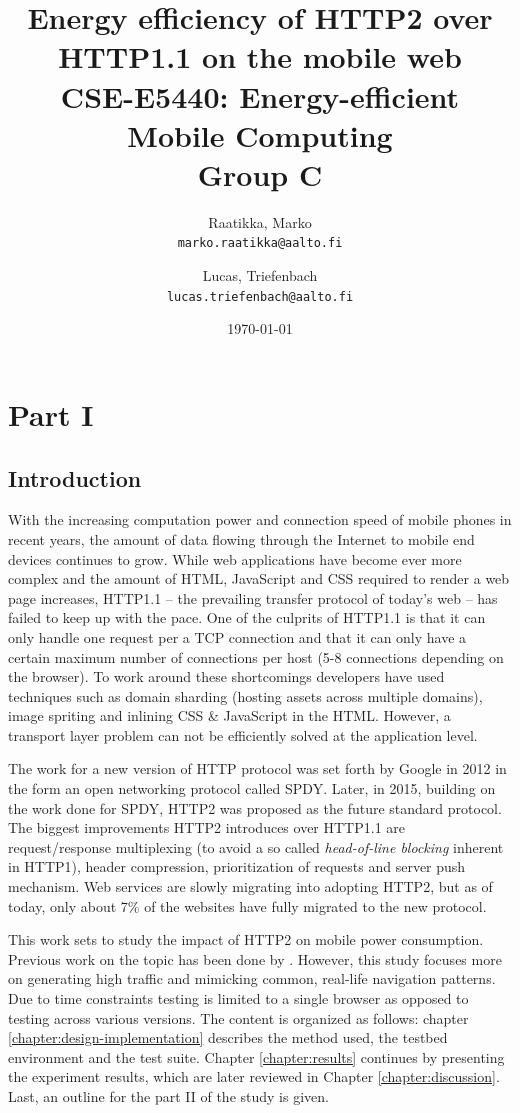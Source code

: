 \documentclass{article}
\author{
  Raatikka, Marko\\
  \texttt{marko.raatikka@aalto.fi}
  \and
  Lucas, Triefenbach\\
  \texttt{lucas.triefenbach@aalto.fi}
}
\title{Energy efficiency of HTTP2 over HTTP1.1 on the mobile web
\\
\vspace{5mm}
\large{CSE-E5440: Energy-efficient Mobile Computing\\Group C}
}
\date{\today}
\begin{document}
\maketitle
\clearpage

\section{Part I}

\subsection{Introduction}
With the increasing computation power and connection speed of mobile phones in recent years, the amount of data flowing through the Internet to mobile end devices continues to grow. While web applications have become ever more complex and the amount of HTML, JavaScript and CSS required to render a web page increases, HTTP1.1 -- the prevailing transfer protocol of today's web -- has failed to keep up with the pace. One of the culprits of HTTP1.1 is that it can only handle one request per a TCP connection and that it can only have a certain maximum number of connections per host (5-8 connections depending on the browser). To work around these shortcomings developers have used techniques such as domain sharding (hosting assets across multiple domains), image spriting and inlining CSS \& JavaScript in the HTML. However, a transport layer problem can not be efficiently solved at the application level.

The work for a new version of HTTP protocol was set forth by Google in 2012 in the form an open networking protocol called SPDY. Later, in 2015, building on the work done for SPDY, HTTP2 was proposed as the future standard protocol. The biggest improvements HTTP2 introduces over HTTP1.1 are request/response multiplexing (to avoid a so called \emph{head-of-line blocking} inherent in HTTP1), header compression, prioritization of requests and server push mechanism. Web services are slowly migrating into adopting HTTP2, but as of today, only about 7\% of the websites have fully migrated to the new protocol. \citep{google-spdy}\citep{http2_stats}\citep{http2}

This work sets to study the impact of HTTP2 on mobile power consumption. Previous work on the topic has been done by \citep{previous_work}. However, this study focuses more on generating high traffic and mimicking common, real-life navigation patterns. Due to time constraints testing is limited to a single browser as opposed to testing across various versions. The content is organized as follows: chapter \ref{chapter:design-implementation} describes the method used, the testbed environment and the test suite. Chapter \ref{chapter:results} continues by presenting the experiment results, which are later reviewed in Chapter \ref{chapter:discussion}. Last, an outline for the part II of the study is given.
\end{document}

